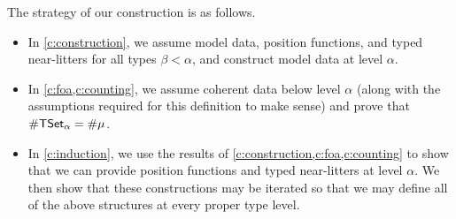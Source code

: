 The strategy of our construction is as follows.
\begin{itemize}
  \item In \cref{c:construction}, we assume model data, position functions, and typed near-litters for all types \( \beta < \alpha \), and construct model data at level \( \alpha \).
  \item In \cref{c:foa,c:counting}, we assume coherent data below level \( \alpha \) (along with the assumptions required for this definition to make sense) and prove that \( \#\mathsf{TSet}_\alpha = \#\mu \).
  \item In \cref{c:induction}, we use the results of \cref{c:construction,c:foa,c:counting} to show that we can provide position functions and typed near-litters at level \( \alpha \).
  We then show that these constructions may be iterated so that we may define all of the above structures at every proper type level.
\end{itemize}
